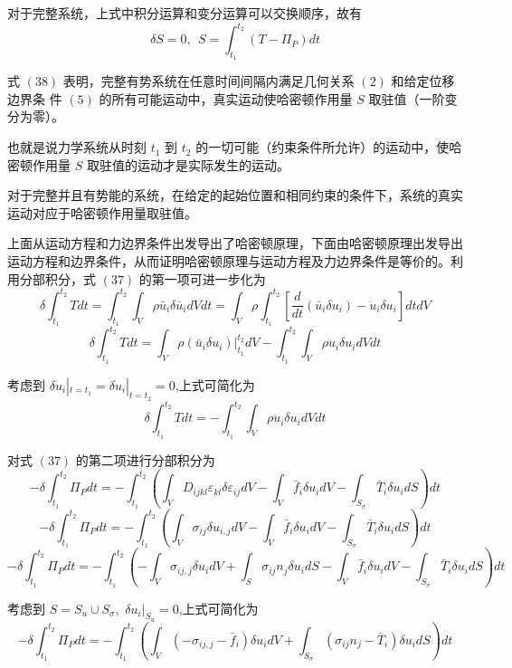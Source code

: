 \documentclass[12pt,a4paper]{article}
\begin{document}
对于完整系统，上式中积分运算和变分运算可以交换顺序，故有
\begin{equation}
\delta S=0,~~S=\int_{t_1}^{t_2}(T-\Pi _P)dt
\end{equation}

式 $(38)$ 表明，完整有势系统在任意时间间隔内满足几何关系 $(2)$ 和给定位移边界条
件 $(5)$ 的所有可能运动中，真实运动使哈密顿作用量 $S$ 取驻值（一阶变分为零）。

也就是说力学系统从时刻 $t_1$ 到 $t_2$ 的一切可能（约束条件所允许）的运动中，使哈密顿作用量 $S$ 取驻值的运动才是实际发生的运动。

对于完整并且有势能的系统，在给定的起始位置和相同约束的条件下，系统的真实运动对应于哈密顿作用量取驻值。

上面从运动方程和力边界条件出发导出了哈密顿原理，下面由哈密顿原理出发导出运动方程和边界条件，从而证明哈密顿原理与运动方程及力边界条件是等价的。利用分部积分，式 $(37)$ 的第一项可进一步化为
$$
\delta\int_{t_1}^{t_2}Tdt=\int_{t_1}^{t_2}\int_{V}\rho\bar{u}_i\delta\bar{u}_idVdt=\int_{V}\rho\int_{t_1}^{t_2}\left[\frac{d}{dt}(\bar{u}_i\delta u_i)-\ddot{u}_i\delta u_i\right]dtdV
$$
\begin{equation}
\delta\int_{t_1}^{t_2}Tdt=\int_{V}\rho(\bar{u}_i\delta u_i)|^{t_2}_{t_1}dV-\int_{t_1}^{t_2}\int_{V}\rho\ddot{u}_i\delta u_idVdt
\end{equation}

考虑到 $\delta u_i|_{t=t_1}=\delta u_i|_{t=t_2}=0$,上式可简化为
\begin{equation}
\delta\int_{t_1}^{t_2}Tdt=-\int_{t_1}^{t_2}\int_{V}\rho\ddot{u}_i\delta u_idVdt
\end{equation}

对式 $(37)$ 的第二项进行分部积分为
$$
-\delta\int_{t_1}^{t_2}\Pi _Pdt=-\int_{t_1}^{t_2}\left(\int_{V}D_{ijkl}\varepsilon_{kl}\delta\varepsilon_{ij}dV-\int_{V}\bar{f}_i\delta u_idV-\int_{S_{\sigma}}\bar{T}_i\delta u_idS\right)dt
$$
$$
-\delta\int_{t_1}^{t_2}\Pi _Pdt=-\int_{t_1}^{t_2}\left(\int_{V}\sigma_{ij}\delta u_{i,j}dV-\int_{V}\bar{f}_i\delta u_idV-\int_{S_{\sigma}}\bar{T}_i\delta u_idS\right)dt
$$
\begin{equation}
-\delta\int_{t_1}^{t_2}\Pi _Pdt=-\int_{t_1}^{t_2}\left(-\int_{V}\sigma_{ij,j}\delta u_idV+\int_{S}\sigma_{ij}n_j\delta u_idS-\int_{V}\bar{f}_i\delta u_idV-\int_{S_{\sigma}}\bar{T}_i\delta u_idS\right)dt
\end{equation}

考虑到 $S=S_u\cup S_{\sigma}$,~$\delta u_i|_{S_u}=0$,上式可简化为
\begin{equation}
-\delta\int_{t_1}^{t_2}\Pi _Pdt=-\int_{t_1}^{t_2}\left(\int_{V}(-\sigma_{ij,j}-\bar{f}_i)\delta u_idV+\int_{S_{\sigma}}(\sigma_{ij}n_j-\bar{T}_i)\delta u_idS\right)dt
\end{equation}
\end{document}

